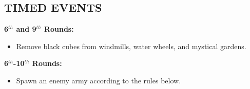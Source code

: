\begin{multicols*}{2}
\subsection*{\MakeUppercase{Timed Events}}

\textbf{6$^{th}$ and 9$^{th}$ Rounds:}
\begin{itemize}
  \item Remove black cubes from windmills, water wheels, and mystical gardens.
\end{itemize}

\textbf{6$^{th}$-10$^{th}$ Rounds:}
\begin{itemize}
  \item Spawn an enemy army according to the rules below.
\end{itemize}

\end{multicols*}

\newpage

